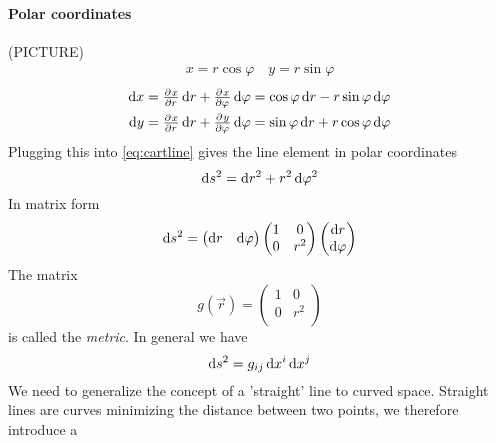 \paragraph{Polar coordinates}
(PICTURE)
\begin{align*}
    x= r\cos\varphi\quad y= r\sin\varphi
\end{align*}
\begin{align*}
    \dif x&= \pd{x}{r}\dif r+\pd{x}{\varphi}\dif \varphi = \cos\varphi\dif r-r\sin\varphi\dif \varphi\\
    \dif y&= \pd{x}{r}\dif r+\pd{y}{\varphi}\dif \varphi = \sin\varphi\dif r+r\cos\varphi\dif \varphi
\end{align*}
Plugging this into \eqref{eq:cartline} gives the line element in polar coordinates
\begin{equation}
    \dif s^2=\dif r^2+r^2\dif \varphi^2
\end{equation}
In matrix form
\begin{equation}
    \dif s^2=
    \begin{pmatrix}
        \dif r& \dif \varphi
    \end{pmatrix}
    \begin{pmatrix}
        1& 0\\
        0& r^2\\
    \end{pmatrix}
    \begin{pmatrix}
        \dif r\\ \dif \varphi
    \end{pmatrix}
\end{equation}
The matrix
\begin{equation}
    g(\vec{r})=
    \begin{pmatrix}
        1& 0\\
        0& r^2\\
    \end{pmatrix}
\end{equation}
is called the \emph{metric}.
In general we have
\begin{equation}
    \dif s^2 = g_{ij}\dif x^i\dif x^j
\end{equation}
We need to generalize the concept of a 'straight' line to curved space. Straight lines are curves minimizing the distance between two points, 
we therefore introduce a
